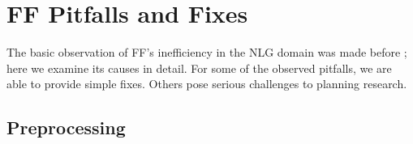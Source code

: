 \section{FF Pitfalls and Fixes}
\label{sec:crisp-ff}


The basic observation of FF's inefficiency in the NLG domain was made
before \cite{koller10:_exper_with_plann_for_natur_languag_gener}; here
we examine its causes in detail. For some of the observed pitfalls, we
are able to provide simple fixes. Others pose serious challenges to
planning research.


\subsection{Preprocessing}
\label{sec:crisp-ff:preprocess}


















